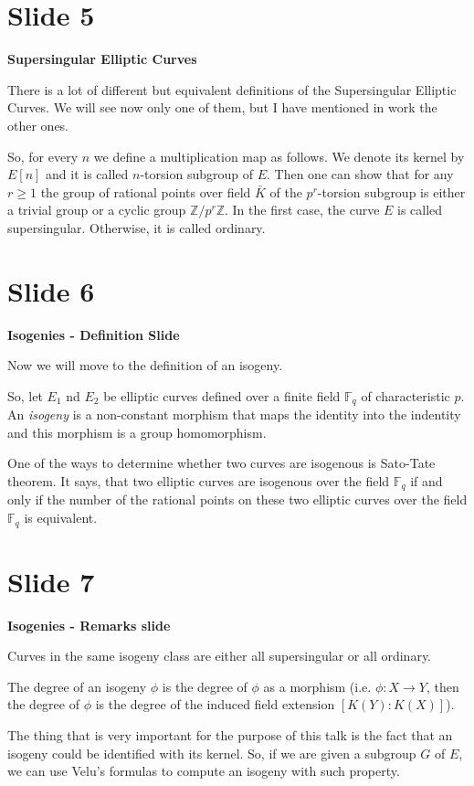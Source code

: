 \documentclass[10 pt]{article}
\begin{document}
\section{Slide 5} \large{\textbf{Supersingular Elliptic Curves}}

There is a lot of different but equivalent definitions of the Supersingular Elliptic Curves. We will see now only one of them, but I have mentioned in work the other ones.

So, for every $n$ we define a multiplication map as follows. We denote its kernel by $E[n]$ and it is called $n$-torsion subgroup of $E$. Then one can show that for any $r \geq 1$ the group of rational points over field $\bar{K}$ of the $p^r$-torsion subgroup is either a trivial group or a cyclic group $\mathbb{Z}/p^r\mathbb{Z}$. In the first case, the curve $E$ is called supersingular. Otherwise, it is called ordinary.

\section{Slide 6} \large{\textbf{Isogenies - Definition Slide}}

Now we will move to the definition of an isogeny. 

So, let $E_1$ nd $E_2$ be elliptic curves defined over a finite field $\mathbb{F}_q$ of characteristic $p$. An \emph{isogeny} is a non-constant morphism that maps the identity into the indentity and this morphism is a group homomorphism. 

One of the ways to determine whether two curves are isogenous is Sato-Tate theorem. It says, that two elliptic curves are isogenous over the field $\mathbb{F}_q$ if and only if the number of the rational points on these two elliptic curves over the field $\mathbb{F}_q$  is equivalent.

\section{Slide 7} \large{\textbf{Isogenies - Remarks slide}}

Curves in the same isogeny class are either all supersingular or all ordinary.

The degree of an isogeny $\phi$ is the degree of $\phi$ as a morphism (i.e. $\phi: X \to Y$, then the degree of $\phi$ is the degree of the induced field extension $[K(Y) : K(X)]$).

The thing that is very important for the purpose of this talk is the fact that an isogeny could be identified with its kernel. So, if we are given a subgroup $G$ of $E$, we can use Velu's formulas to compute an isogeny with such property.
\end{document}
